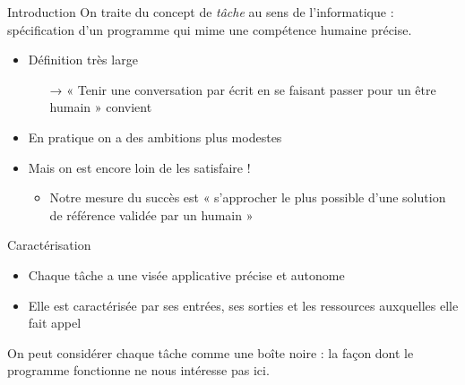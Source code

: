 \documentclass[hyperref={unicode}, xcolor={svgnames}, french]{beamer}
\begin{document}
\begin{frame}{Introduction}
    On traite du concept de \textit{tâche} au sens de l'informatique : spécification d'un programme qui mime une compétence humaine précise.

    \begin{itemize}
        \item Définition très large
            \begin{itemize}
                \item[→] « Tenir une conversation par écrit en se faisant passer pour un être humain » convient
            \end{itemize}
        \item En pratique on a \alert{des ambitions plus modestes}
        \item Mais on est encore loin de les satisfaire !
         \begin{itemize}
             \item Notre mesure du succès est « s'approcher le plus possible d'une solution de référence validée par un humain »
         \end{itemize}
    \end{itemize}
 \end{frame}

\begin{frame}{Caractérisation}
    \begin{itemize}
        \item Chaque tâche a une visée applicative précise et autonome
        \item Elle est caractérisée par ses \alert{entrées}, ses \alert{sorties} et les \alert{ressources} auxquelles elle fait appel
    \end{itemize}

    \begin{figure}
        \tikzset{external/export=true}
    \end{figure}

    On peut considérer chaque tâche comme une \alert{boîte noire} : la façon dont le programme fonctionne ne nous intéresse pas ici.
\end{frame}
\end{document}
